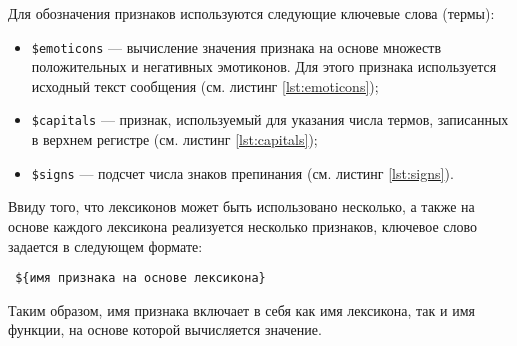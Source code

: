     Для обозначения признаков используются следующие ключевые слова (термы):
    \begin{itemize}
        \item {\tt \$emoticons} --- вычисление значения признака на основе
            множеств положительных и негативных эмотиконов.
            Для этого признака используется исходный текст сообщения
            (см. листинг \ref{lst:emoticons});
        \item {\tt \$capitals} --- признак, используемый для указания числа термов,
            записанных в верхнем регистре (см. листинг \ref{lst:capitals});

        \item {\tt \$signs} --- подсчет числа знаков препинания (см. листинг
            \ref{lst:signs}).
    \end{itemize}

    Ввиду того, что лексиконов может быть использовано несколько, а также на основе
    каждого лексикона реализуется несколько признаков, ключевое слово
    задается в следующем формате:
    \begin{center}
        \tt
        \$\{имя признака на основе лексикона\}
    \end{center}

    Таким образом, имя признака включает в себя как имя лексикона, так и имя
    функции, на основе которой вычисляется значение.
    \lstset{style=python}
    

    \lstset{style=python}
    

    \lstset{style=python}
    
